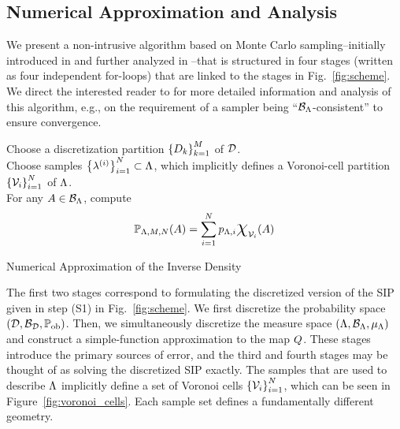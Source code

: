 \subsection{Numerical Approximation and Analysis}\label{sec:set-algorithm}
We present a non-intrusive algorithm based on Monte Carlo sampling\---initially introduced in \cite{BET+14} and further analyzed in \cite{BET+14-arxiv}\---that is structured in four stages (written as four independent for-loops) that are linked to the stages in Fig.~\ref{fig:scheme}.
We direct the interested reader to \cite{BET+14-arxiv} for more detailed information and analysis of this algorithm, e.g., on the requirement of a sampler being ``$\mathcal{B}_{{\Lambda}}$-consistent'' to ensure convergence.


\begin{algorithm}[hbtp]
\DontPrintSemicolon
Choose a discretization partition $\left\{D_k\right\}_{k=1}^{M}$ of $\mathcal{D}$.\\
	Choose samples $\left\{\lambda^{(i)}\right\}_{i=1}^{N} \subset {\Lambda}$, which implicitly defines a Voronoi-cell partition $\left\{\mathcal{V}_i\right\}_{i=1}^{N}$ of ${\Lambda}$.\\
	For any $A\in \mathcal{B}_{{\Lambda}}$, compute
	\begin{equation}
	\PP_{\pspace, \ndiscs, \nsamps} (A) = \sum_{\iparam=1}^\nsamps p_{\pspace, \iparam} \Chi_{\VV_\iparam} (A)
	\end{equation}
 \caption{Numerical Approximation of the Inverse Density}
 \label{alg:inv_density}
\end{algorithm}


The first two stages correspond to formulating the discretized version of the SIP given in step (S1) in Fig.~\ref{fig:scheme}.
We first discretize the probability space $(\mathcal{D}, \mathcal{B}_{\mathcal{D}}, \operatorname*{\mathbb{P}_{ob}})$.
Then, we simultaneously discretize the measure space $({\Lambda}, \mathcal{B}_{{\Lambda}}, \mu_{{\Lambda}})$ and construct a simple-function approximation to the map $Q$.
These stages introduce the primary sources of error, and the third and fourth stages may be thought of as solving the discretized SIP exactly.
The samples that are used to describe ${\Lambda}$ implicitly define a set of Voronoi cells $\left\{\mathcal{V}_i\right\}_{i=1}^{N}$, which can be seen in Figure~\ref{fig:voronoi_cells}.
Each sample set defines a fundamentally different geometry.

